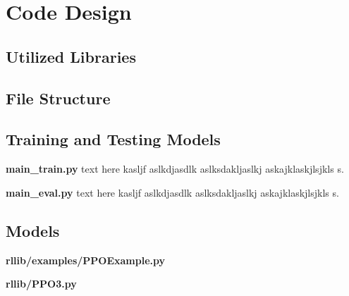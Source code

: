 \section{Code Design}

\subsection{Utilized Libraries}

\subsection{File Structure}

\subsection{Training and Testing Models}

\textbf{main\_train.py} text here kasljf aslkdjasdlk aslksdakljaslkj askajklaskjlsjkls s.

\textbf{main\_eval.py} text here kasljf aslkdjasdlk aslksdakljaslkj askajklaskjlsjkls s.


\subsection{Models}

\textbf{rllib/examples/PPOExample.py}

\textbf{rllib/PPO3.py}

%


